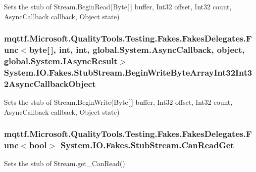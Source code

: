 Sets the stub of Stream.\-Begin\-Read(\-Byte\mbox{[}$\,$\mbox{]} buffer, Int32 offset, Int32 count, Async\-Callback callback, Object state)

\hypertarget{class_system_1_1_i_o_1_1_fakes_1_1_stub_stream_ab1674477856779654707f19d1ed060f6}{
\subsubsection[{Begin\-Write\-Byte\-Array\-Int32\-Int32\-Async\-Callback\-Object}]{\setlength{\rightskip}{0pt plus 5cm}mqttf.\-Microsoft.\-Quality\-Tools.\-Testing.\-Fakes.\-Fakes\-Delegates.\-Func$<$byte\mbox{[}$\,$\mbox{]}, int, int, global.\-System.\-Async\-Callback, object, global.\-System.\-I\-Async\-Result$>$ System.\-I\-O.\-Fakes.\-Stub\-Stream.\-Begin\-Write\-Byte\-Array\-Int32\-Int32\-Async\-Callback\-Object}}\label{class_system_1_1_i_o_1_1_fakes_1_1_stub_stream_ab1674477856779654707f19d1ed060f6}


Sets the stub of Stream.\-Begin\-Write(\-Byte\mbox{[}$\,$\mbox{]} buffer, Int32 offset, Int32 count, Async\-Callback callback, Object state)

\hypertarget{class_system_1_1_i_o_1_1_fakes_1_1_stub_stream_a7b1ab5cb7f665ce0d52337b539c6d6ba}{
\subsubsection[{Can\-Read\-Get}]{\setlength{\rightskip}{0pt plus 5cm}mqttf.\-Microsoft.\-Quality\-Tools.\-Testing.\-Fakes.\-Fakes\-Delegates.\-Func$<$bool$>$ System.\-I\-O.\-Fakes.\-Stub\-Stream.\-Can\-Read\-Get}}\label{class_system_1_1_i_o_1_1_fakes_1_1_stub_stream_a7b1ab5cb7f665ce0d52337b539c6d6ba}


Sets the stub of Stream.\-get\-\_\-\-Can\-Read()

